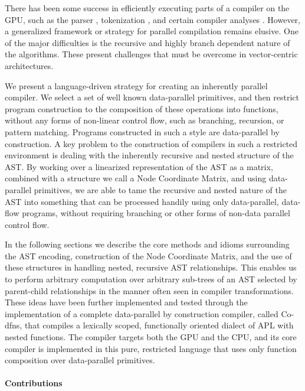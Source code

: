 \documentclass[numbers,preprint]{sigplanconf}
\begin{document}
There has been some success in efficiently executing parts of a compiler 
on the GPU, such as the parser \cite{bunda1984apl}, 
tokenization \cite{bernecky2003tokenizer}, and certain compiler 
analyses \cite{prabhu2011eigencfa,mendez2012inclusion}. However, a generalized 
framework or strategy for parallel compilation remains elusive. One of 
the major difficulties is the recursive and highly branch dependent nature 
of the algorithms. These present challenges that must be overcome in 
vector-centric architectures. 

We present a language-driven strategy for creating an inherently parallel 
compiler. We select a set of well known data-parallel primitives, and then 
restrict program construction to the composition of these operations into 
functions, without any forms of non-linear control flow, such as branching, 
recursion, or pattern matching. Programs constructed in such a style are 
data-parallel by construction. A key problem to the construction of compilers 
in such a restricted environment is dealing with the inherently recursive and 
nested structure of the AST. By working over a linearized representation of 
the AST as a matrix, combined with a structure we call a Node Coordinate 
Matrix, and using data-parallel primitives, we are able to tame the recursive 
and nested nature of the AST into something that can be processed handily 
using only data-parallel, data-flow programs, without requiring branching 
or other forms of non-data parallel control flow. 

In the following sections we describe the core methods and idioms surrounding 
the AST encoding, construction of the Node Coordinate Matrix, and the use 
of these structures in handling nested, recursive AST relationships. This 
enables us to perform arbitrary computation over arbitrary sub-trees of an 
AST selected by parent-child relationships in the manner often seen in 
compiler transformations. These ideas have been further implemented and tested 
through the implementation of a complete data-parallel by construction 
compiler, called Co-dfns, that compiles a lexically scoped, functionally 
oriented dialect of APL with nested functions. The compiler targets both the 
GPU and the CPU, and its core compiler is implemented in this pure, restricted 
language that uses only function composition over data-parallel primitives. 

\paragraph{Contributions}
\end{document}
